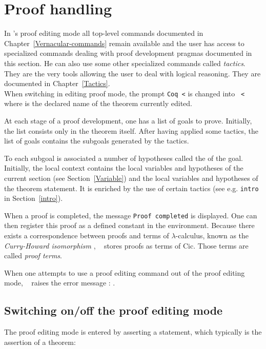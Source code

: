 \chapter[Proof handling]{Proof handling
\label{Proof-handling}}

In \Coq's proof editing mode all top-level commands documented in 
Chapter~\ref{Vernacular-commands} remain available
and the user has access to specialized commands dealing with proof
development pragmas documented in this section. He can also use some
other specialized commands called {\em tactics}.  They are the very
tools allowing the user to deal with logical reasoning. They are
documented in Chapter~\ref{Tactics}.\\ 
When switching in editing proof mode, the prompt
{\tt Coq <} is changed into {\tt {\ident} <} where {\ident} is the
declared name of the theorem currently edited.

At each stage of a proof development, one has a list of goals to
prove. Initially, the list consists only in the theorem itself. After
having applied some tactics, the list of goals contains the subgoals
generated by the tactics.

To each subgoal is associated  a number of
hypotheses called the {\em {}} of the goal.
Initially, the local context contains the local variables and
hypotheses of the current section (see Section~\ref{Variable}) and the
local variables and hypotheses of the theorem statement.  It is
enriched by the use of certain tactics (see e.g. {\tt intro} in
Section~\ref{intro}).

When a proof is completed, the message {\tt Proof completed} is
displayed. One can then register this proof as a defined constant in the
environment. Because there exists a correspondence between proofs and
terms of $\lambda$-calculus, known as the {\em Curry-Howard
isomorphism} \cite{How80,Bar91,Gir89,Hue89}, \Coq~ stores proofs as
terms of {\sc Cic}. Those terms are called {\em proof
  terms}.

\ErrMsg When one attempts to use a proof editing command out of the
proof editing mode, \Coq~ raises the error message : .

\section{Switching on/off the proof editing mode}

The proof editing mode is entered by asserting a statement, which
typically is the assertion of a theorem:

